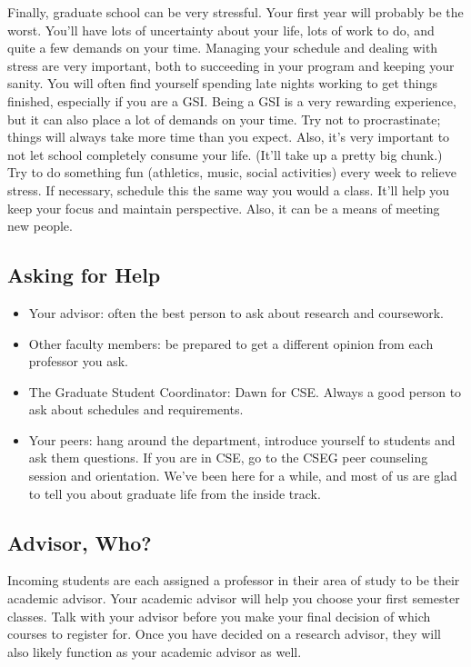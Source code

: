 \documentclass[11pt]{article}
\begin{document}
Finally, graduate school can be very stressful.  Your first year will
probably be the worst.  You’ll have lots of uncertainty about your
life, lots of work to do, and quite a few demands on your time.
Managing your schedule and dealing with stress are very important,
both to succeeding in your program and keeping your sanity.  You will
often find yourself spending late nights working to get things
finished, especially if you are a GSI.  Being a GSI is a very
rewarding experience, but it can also place a lot of demands on your
time.  Try not to procrastinate; things will always take more time
than you expect.  Also, it’s very important to not let school
completely consume your life. (It’ll take up a pretty big chunk.)  Try
to do something fun (athletics, music, social activities) every week
to relieve stress.  If necessary, schedule this the same way you would
a class.  It’ll help you keep your focus and maintain perspective.
Also, it can be a means of meeting new people.
\subsection{Asking for Help}
\label{sec-5_2}


\begin{itemize}
\item Your advisor: often the best person to ask about research and coursework.
\item Other faculty members: be prepared to get a different opinion from each professor you ask.
\item The Graduate Student Coordinator:  Dawn for CSE.  Always a good person to ask about schedules and requirements.
\item Your peers:  hang around the department, introduce yourself to
  students and ask them questions.  If you are in CSE, go to the CSEG
  peer counseling session and orientation.  We've been here for a
  while, and most of us are glad to tell you about graduate life from
  the inside track.
\end{itemize}
\subsection{Advisor, Who?}
\label{sec-5_3}

Incoming students are each assigned a professor in their area of study
to be their academic advisor.  Your academic advisor will help you
choose your first semester classes.  Talk with your advisor before you
make your final decision of which courses to register for.  Once you
have decided on a research advisor, they will also likely function as
your academic advisor as well.
\end{document}
